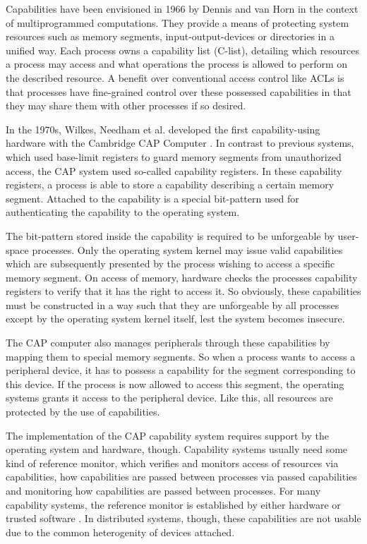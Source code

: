Capabilities have been envisioned in 1966 by Dennis and van Horn \cite{dennis1966programming} in the context of multiprogrammed computations.
They provide a means of protecting system resources such as memory segments, input-output-devices or directories in a unified way.
Each process owns a capability list (C-list), detailing which resources a process may access and what operations the process is allowed to perform on the described resource.
A benefit over conventional access control like ACLs is that processes have fine-grained control over these possessed capabilities in that they may share them with other processes if so desired.

In the 1970s, Wilkes, Needham et al. developed the first capability-using hardware with the Cambridge CAP Computer \cite{wilkes1979cambridge}.
In contrast to previous systems, which used base-limit registers to guard memory segments from unauthorized access, the CAP system used so-called capability registers.
In these capability registers, a process is able to store a capability describing a certain memory segment.
Attached to the capability is a special bit-pattern used for authenticating the capability to the operating system.

The bit-pattern stored inside the capability is required to be unforgeable by user-space processes.
Only the operating system kernel may issue valid capabilities which are subsequently presented by the process wishing to access a specific memory segment.
On access of memory, hardware checks the processes capability registers to verify that it has the right to access it.
So obviously, these capabilities must be constructed in a way such that they are unforgeable by all processes except by the operating system kernel itself, lest the system becomes insecure.

The CAP computer also manages peripherals through these capabilities by mapping them to special memory segments.
So when a process wants to access a peripheral device, it has to possess a capability for the segment corresponding to this device.
If the process is now allowed to access this segment, the operating systems grants it access to the peripheral device.
Like this, all resources are protected by the use of capabilities.

The implementation of the CAP capability system requires support by the operating system and hardware, though.
Capability systems usually need some kind of reference monitor, which verifies and monitors access of resources via capabilities, how capabilities are passed between processes via passed capabilities and monitoring how capabilities are passed between processes.
For many capability systems, the reference monitor is established by either hardware or trusted software \cite{shapiro1999eros,wilkes1979cambridge,bershad1995extensibility}.
In distributed systems, though, these capabilities are not usable due to the common heterogenity of devices attached.

